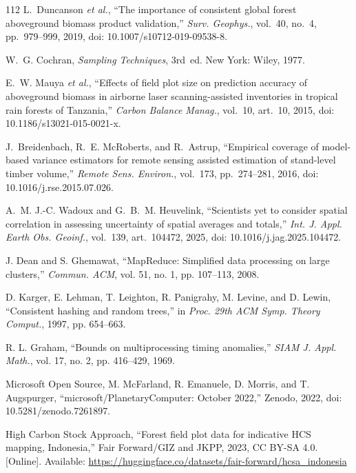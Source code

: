 \documentclass[conference,a4paper]{IEEEtran}
\begin{document}
\begin{thebibliography}{112}
L.~Duncanson \textit{et al.}, ``The importance of consistent global forest aboveground biomass product validation,'' \textit{Surv. Geophys.}, vol.~40, no.~4, pp.~979--999, 2019, doi: 10.1007/s10712-019-09538-8.

W.~G. Cochran, \textit{Sampling Techniques}, 3rd~ed. New York: Wiley, 1977.

E.~W. Mauya \textit{et al.}, ``Effects of field plot size on prediction accuracy of aboveground biomass in airborne laser scanning-assisted inventories in tropical rain forests of Tanzania,'' \textit{Carbon Balance Manag.}, vol.~10, art.~10, 2015, doi: 10.1186/s13021-015-0021-x.

J.~Breidenbach, R.~E. McRoberts, and R.~Astrup, ``Empirical coverage of model-based variance estimators for remote sensing assisted estimation of stand-level timber volume,'' \textit{Remote Sens. Environ.}, vol.~173, pp.~274--281, 2016, doi: 10.1016/j.rse.2015.07.026.

A.~M. J.-C. Wadoux and G.~B.~M. Heuvelink, ``Scientists yet to consider spatial correlation in assessing uncertainty of spatial averages and totals,'' \textit{Int. J. Appl. Earth Obs. Geoinf.}, vol.~139, art.~104472, 2025, doi: 10.1016/j.jag.2025.104472.

J. Dean and S. Ghemawat, ``MapReduce: Simplified data processing on large clusters,'' \textit{Commun. ACM}, vol. 51, no. 1, pp. 107--113, 2008.

D. Karger, E. Lehman, T. Leighton, R. Panigrahy, M. Levine, and D. Lewin, ``Consistent hashing and random trees,'' in \textit{Proc. 29th ACM Symp. Theory Comput.}, 1997, pp. 654--663.

R. L. Graham, ``Bounds on multiprocessing timing anomalies,'' \textit{SIAM J. Appl. Math.}, vol. 17, no. 2, pp. 416--429, 1969.

Microsoft Open Source, M. McFarland, R. Emanuele, D. Morris, and T. Augspurger, ``microsoft/PlanetaryComputer: October 2022,'' Zenodo, 2022, doi: 10.5281/zenodo.7261897.

High Carbon Stock Approach, ``Forest field plot data for indicative HCS mapping, Indonesia,'' Fair Forward/GIZ and JKPP, 2023, CC BY-SA 4.0. [Online]. Available: \url{https://huggingface.co/datasets/fair-forward/hcsa_indonesia}


\end{thebibliography}
\end{document}
